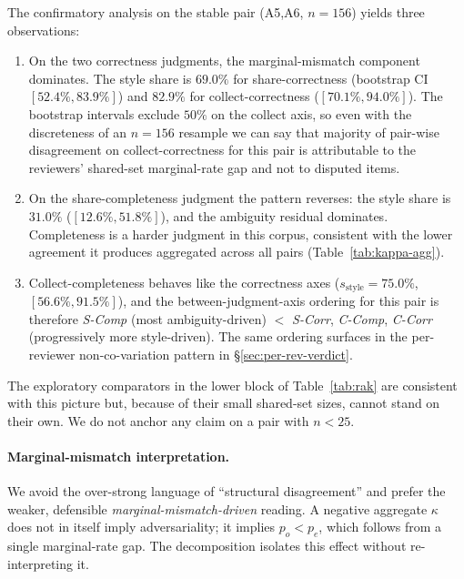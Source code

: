 \documentclass[11pt,a4paper]{article}
\newcommand{\Acc}[1]{\textsf{A#1}}
\begin{document}
The confirmatory analysis on the stable pair (\Acc{5},\Acc{6}, $n=156$)
yields three observations:

\begin{enumerate}[leftmargin=*,topsep=2pt]
\item On the two correctness judgments, the marginal-mismatch
       component dominates. The style share is $69.0\%$ for
       share-correctness (bootstrap CI $[52.4\%,83.9\%]$) and
       $82.9\%$ for collect-correctness ($[70.1\%,94.0\%]$). The
       bootstrap intervals exclude $50\%$ on the collect axis, so
       even with the discreteness of an $n=156$ resample we can
       say that majority of pair-wise disagreement on
       collect-correctness for this pair is attributable to the
       reviewers' shared-set marginal-rate gap and not to disputed
       items.
\item On the share-completeness judgment the pattern reverses: the
       style share is $31.0\%$ ($[12.6\%,51.8\%]$), and the
       ambiguity residual dominates. Completeness is a harder
       judgment in this corpus, consistent with the lower agreement
       it produces aggregated across all pairs (Table~\ref{tab:kappa-agg}).
\item Collect-completeness behaves like the correctness axes
       ($s_{\text{style}}=75.0\%$, $[56.6\%,91.5\%]$), and the
       between-judgment-axis ordering for this pair is therefore
       \emph{S-Comp} (most ambiguity-driven) $<$ \emph{S-Corr},
       \emph{C-Comp}, \emph{C-Corr} (progressively more
       style-driven). The same ordering surfaces in the
       per-reviewer non-co-variation pattern in
       \S\ref{sec:per-rev-verdict}.
\end{enumerate}

The exploratory comparators in the lower block of Table~\ref{tab:rak}
are consistent with this picture but, because of their small
shared-set sizes, cannot stand on their own. We do not anchor any
claim on a pair with $n<25$.

\paragraph{Marginal-mismatch interpretation.}
We avoid the over-strong language of ``structural disagreement'' and
prefer the weaker, defensible \emph{marginal-mismatch-driven}
reading. A negative aggregate $\kappa$ does not in itself imply
adversariality; it implies $p_o<p_e$, which follows from a single
marginal-rate gap. The decomposition isolates this effect without
re-interpreting it.
\end{document}
